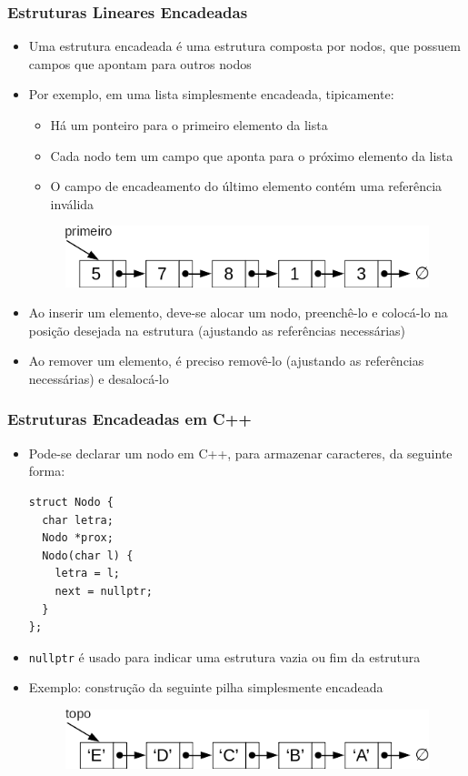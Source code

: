 \documentclass[aspectratio=169]{beamer}
\begin{document}
\begin{frame}\frametitle{Estruturas Lineares Encadeadas}
\begin{itemize}
	\item Uma estrutura encadeada é uma estrutura composta por nodos, que possuem campos que apontam para outros nodos
	\item Por exemplo, em uma lista simplesmente encadeada, tipicamente:
	\begin{itemize}
		\item Há um ponteiro para o primeiro elemento da lista
		\item Cada nodo tem um campo que aponta para o próximo elemento da lista
		\item O campo de encadeamento do último elemento contém uma referência inválida
	\end{itemize}
\begin{figure}[h]
	\centering
	\includegraphics[height=0.15\paperheight]{imagens/lista_simplesmente_encadeada2.png}
\end{figure}
	\item Ao inserir um elemento, deve-se alocar um nodo, preenchê-lo e colocá-lo na posição desejada na estrutura (ajustando as referências necessárias)
	\item Ao remover um elemento, é preciso removê-lo (ajustando as referências necessárias) e desalocá-lo
\end{itemize}
\end{frame}

\begin{frame}[fragile]\frametitle{Estruturas Encadeadas em C++}
\begin{itemize}
	\item Pode-se declarar um nodo em C++, para armazenar caracteres, da seguinte forma:
\begin{lstlisting}[basicstyle=\ttfamily\scriptsize]
struct Nodo {
  char letra;
  Nodo *prox;
  Nodo(char l) {
    letra = l;
    next = nullptr;
  }
};
\end{lstlisting}
	\item \texttt{nullptr} é usado para indicar uma estrutura vazia ou fim da estrutura
	\item Exemplo: construção da seguinte pilha simplesmente encadeada
\begin{figure}[h]
	\centering
	\includegraphics[height=0.15\paperheight]{imagens/pilha_simplesmente_encadeada.png}
\end{figure}
\end{itemize}
\end{frame}
\end{document}
